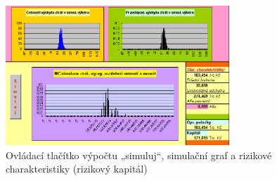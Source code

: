 \documentclass{article}
\begin{document}
\begin{figure}[H]
  \caption{Ovládací tlačítko výpočtu „simuluj“, simulační graf a rizikové charakteristiky (rizikový kapitál)}
  \centering
    \includegraphics[width=0.75\textwidth]{simuluj}
\end{figure}



\end{document}
